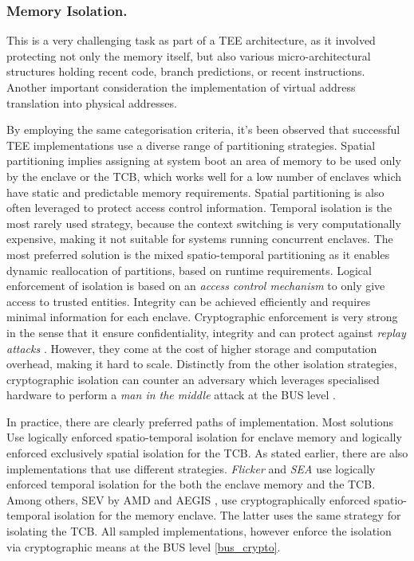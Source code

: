 \documentclass[runningheads,a4paper]{uwsese}
\begin{document}
\subsubsection{Memory Isolation.}
\label{mem_isolation}

This is a very challenging task as part of a TEE architecture, as it involved
protecting not only the memory itself, but also various micro-architectural
structures holding recent code, branch predictions, or recent instructions.
Another important consideration the implementation of virtual address
translation into physical addresses.

By employing the same categorisation criteria, it's been observed that
successful TEE implementations use a diverse range of partitioning strategies.
Spatial partitioning implies assigning at system boot an area of memory to be
used only by the enclave or the TCB, which works well for a low number of
enclaves which have static and predictable memory requirements. Spatial
partitioning is also often leveraged to protect access control information.
Temporal isolation is the most rarely used strategy, because the context
switching is very computationally expensive, making it not suitable for systems
running concurrent enclaves. The most preferred solution is the mixed
spatio-temporal partitioning as it enables dynamic reallocation of partitions,
based on runtime requirements. Logical enforcement of isolation is based on an
\emph{access control mechanism} \label{acc_control} to only give access to
trusted entities. Integrity can be achieved efficiently and requires minimal
information for each enclave. Cryptographic enforcement is very strong in the
sense that it ensure confidentiality, integrity and can protect against
\emph{replay attacks} \cite{tee_replay_attacks}. However, they come at the cost
of higher storage and computation overhead, making it hard to scale. Distinctly
from the other isolation strategies, cryptographic isolation can counter an
adversary which leverages specialised hardware to perform a \emph{man in the
middle} attack at the BUS level \cite{tee_hw_sup} \label{bus_crypto}.

In practice, there are clearly preferred paths of implementation. Most
solutions Use logically enforced spatio-temporal isolation for enclave memory
and logically enforced exclusively spatial isolation for the TCB. As stated
earlier, there are also implementations that use different strategies.
\emph{Flicker} \cite{flicker} and \emph{SEA} \cite{sea_minimal_tcb} use
logically enforced temporal isolation for the both the enclave memory and the
TCB. Among others, SEV \cite{amd_sev} by AMD and AEGIS \cite{aegis}, use
cryptographically enforced spatio-temporal isolation for the memory enclave.
The latter uses the same strategy for isolating the TCB. All sampled
implementations, however enforce the isolation via cryptographic means at the
BUS level \ref{bus_crypto}.
\end{document}
